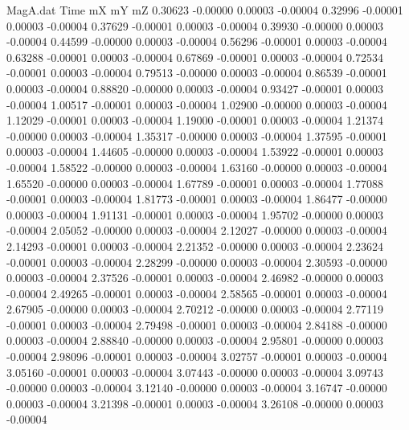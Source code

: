 \begin{filecontents}{MagA.dat}
Time mX mY mZ
   0.30623   -0.00000    0.00003   -0.00004
   0.32996   -0.00001    0.00003   -0.00004
   0.37629   -0.00001    0.00003   -0.00004
   0.39930   -0.00000    0.00003   -0.00004
   0.44599   -0.00000    0.00003   -0.00004
   0.56296   -0.00001    0.00003   -0.00004
   0.63288   -0.00001    0.00003   -0.00004
   0.67869   -0.00001    0.00003   -0.00004
   0.72534   -0.00001    0.00003   -0.00004
   0.79513   -0.00000    0.00003   -0.00004
   0.86539   -0.00001    0.00003   -0.00004
   0.88820   -0.00000    0.00003   -0.00004
   0.93427   -0.00001    0.00003   -0.00004
   1.00517   -0.00001    0.00003   -0.00004
   1.02900   -0.00000    0.00003   -0.00004
   1.12029   -0.00001    0.00003   -0.00004
   1.19000   -0.00001    0.00003   -0.00004
   1.21374   -0.00000    0.00003   -0.00004
   1.35317   -0.00000    0.00003   -0.00004
   1.37595   -0.00001    0.00003   -0.00004
   1.44605   -0.00000    0.00003   -0.00004
   1.53922   -0.00001    0.00003   -0.00004
   1.58522   -0.00000    0.00003   -0.00004
   1.63160   -0.00000    0.00003   -0.00004
   1.65520   -0.00000    0.00003   -0.00004
   1.67789   -0.00001    0.00003   -0.00004
   1.77088   -0.00001    0.00003   -0.00004
   1.81773   -0.00001    0.00003   -0.00004
   1.86477   -0.00000    0.00003   -0.00004
   1.91131   -0.00001    0.00003   -0.00004
   1.95702   -0.00000    0.00003   -0.00004
   2.05052   -0.00000    0.00003   -0.00004
   2.12027   -0.00000    0.00003   -0.00004
   2.14293   -0.00001    0.00003   -0.00004
   2.21352   -0.00000    0.00003   -0.00004
   2.23624   -0.00001    0.00003   -0.00004
   2.28299   -0.00000    0.00003   -0.00004
   2.30593   -0.00000    0.00003   -0.00004
   2.37526   -0.00001    0.00003   -0.00004
   2.46982   -0.00000    0.00003   -0.00004
   2.49265   -0.00001    0.00003   -0.00004
   2.58565   -0.00001    0.00003   -0.00004
   2.67905   -0.00000    0.00003   -0.00004
   2.70212   -0.00000    0.00003   -0.00004
   2.77119   -0.00001    0.00003   -0.00004
   2.79498   -0.00001    0.00003   -0.00004
   2.84188   -0.00000    0.00003   -0.00004
   2.88840   -0.00000    0.00003   -0.00004
   2.95801   -0.00000    0.00003   -0.00004
   2.98096   -0.00001    0.00003   -0.00004
   3.02757   -0.00001    0.00003   -0.00004
   3.05160   -0.00001    0.00003   -0.00004
   3.07443   -0.00000    0.00003   -0.00004
   3.09743   -0.00000    0.00003   -0.00004
   3.12140   -0.00000    0.00003   -0.00004
   3.16747   -0.00000    0.00003   -0.00004
   3.21398   -0.00001    0.00003   -0.00004
   3.26108   -0.00000    0.00003   -0.00004

\end{filecontents}
